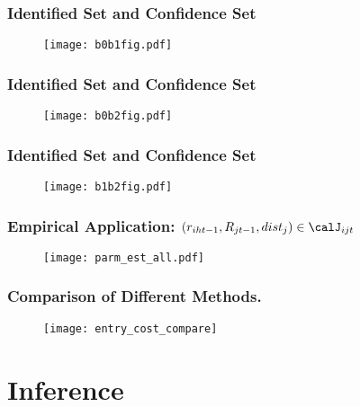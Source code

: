 \begin{frame}
\frametitle{Identified Set and Confidence Set}

\begin{figure}
\centering
\texttt{[image: b0b1fig.pdf]}
\end{figure}
\end{frame}
\begin{frame}
\frametitle{Identified Set and Confidence Set}

\begin{figure}
\centering
\texttt{[image: b0b2fig.pdf]}
\end{figure}
\end{frame}
\begin{frame}
\frametitle{Identified Set and Confidence Set}

\begin{figure}
\centering
\texttt{[image: b1b2fig.pdf]}
\end{figure}
\end{frame}
\begin{frame}
\frametitle{Empirical Application: $(r_{iht-1},R_{jt-1},dist_{j})\in\calJ_{ijt}$}

\begin{figure}[h]
\centering\texttt{[image: parm\_est\_all.pdf]}
\end{figure}

\end{frame}

\begin{frame}
\frametitle{Comparison of Different Methods.}

\begin{figure}[h]
\centering\texttt{[image: entry\_cost\_compare]}
\end{figure}

\end{frame}



\section{Inference}

